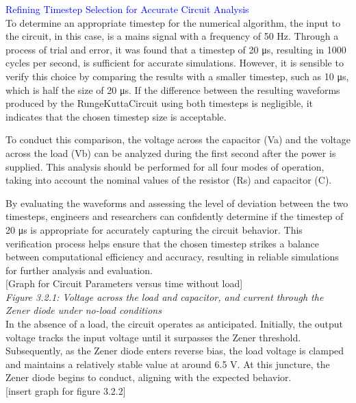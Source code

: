 \textcolor{blue}{Refining Timestep Selection for Accurate Circuit Analysis}\\


To determine an appropriate timestep for the numerical algorithm, the input to the circuit, in this case, is a mains signal with a frequency of 50 Hz. Through a process of trial and error, it was found that a timestep of 20 μs, resulting in 1000 cycles per second, is sufficient for accurate simulations. However, it is sensible to verify this choice by comparing the results with a smaller timestep, such as 10 μs, which is half the size of 20 μs. If the difference between the resulting waveforms produced by the RungeKuttaCircuit using both timesteps is negligible, it indicates that the chosen timestep size is acceptable.

To conduct this comparison, the voltage across the capacitor (Va) and the voltage across the load (Vb) can be analyzed during the first second after the power is supplied. This analysis should be performed for all four modes of operation, taking into account the nominal values of the resistor (Rs) and capacitor (C).

By evaluating the waveforms and assessing the level of deviation between the two timesteps, engineers and researchers can confidently determine if the timestep of 20 μs is appropriate for accurately capturing the circuit behavior. This verification process helps ensure that the chosen timestep strikes a balance between computational efficiency and accuracy, resulting in reliable simulations for further analysis and evaluation.\\

[Graph for Circuit Parameters versus time without load]\\

\emph{Figure 3.2.1: Voltage across the load and capacitor, and current through the Zener diode under no-load conditions}\\

In the absence of a load, the circuit operates as anticipated. Initially, the output voltage tracks the input voltage until it surpasses the Zener threshold. Subsequently, as the Zener diode enters reverse bias, the load voltage is clamped and maintains a relatively stable value at around 6.5 V. At this juncture, the Zener diode begins to conduct, aligning with the expected behavior.\\

[insert graph for figure 3.2.2]\\

